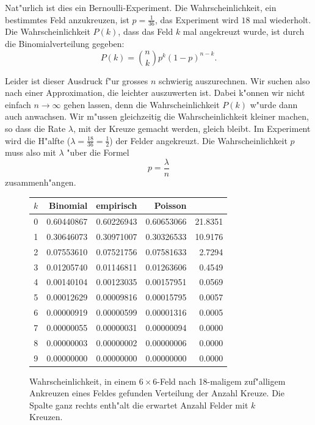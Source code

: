 Nat"urlich ist dies ein Bernoulli-Experiment. Die Wahrscheinlichkeit, ein
bestimmtes Feld anzukreuzen, ist $p=\frac{1}{36}$, das Experiment
wird $18$ mal wiederholt. Die Wahrscheinlichkeit $P(k)$, dass das Feld $k$ mal
angekreuzt wurde, ist durch die Binomialverteilung gegeben:
\[
P(k)=\binom{n}{k}p^k(1-p)^{n-k}.
\]

Leider ist dieser Ausdruck f"ur grosses $n$ schwierig auszurechnen.
Wir suchen also nach einer Approximation, die leichter auszuwerten ist.
Dabei k"onnen wir nicht einfach $n\to\infty$ gehen lassen, denn die
Wahrscheinlichkeit $P(k)$ w"urde dann auch anwachsen. Wir m"ussen
gleichzeitig die Wahrscheinlichkeit kleiner machen, so dass die Rate $\lambda$,
mit der Kreuze gemacht werden, gleich bleibt. Im Experiment wird
die H"alfte ($\lambda=\frac{18}{36}=\frac12$) der Felder angekreuzt.
Die Wahrscheinlichkeit $p$ muss also mit $\lambda$ "uber die Formel
\[
p=\frac{\lambda}{n}
\]
zusammenh"angen.

\begin{figure}
\begin{center}
\begin{tabular}{|r|r|r|r|r|}
\hline
$k$&Binomial&empirisch&Poisson&\\
\hline
0&   0.60440867 & 0.60226943 & 0.60653066 & 21.8351 \\
1&   0.30646073 & 0.30971007 & 0.30326533 & 10.9176 \\
2&   0.07553610 & 0.07521756 & 0.07581633 &  2.7294 \\
3&   0.01205740 & 0.01146811 & 0.01263606 &  0.4549 \\
4&   0.00140104 & 0.00123035 & 0.00157951 &  0.0569 \\
5&   0.00012629 & 0.00009816 & 0.00015795 &  0.0057 \\
6&   0.00000919 & 0.00000599 & 0.00001316 &  0.0005 \\
7&   0.00000055 & 0.00000031 & 0.00000094 &  0.0000 \\
8&   0.00000003 & 0.00000002 & 0.00000006 &  0.0000 \\
9&   0.00000000 & 0.00000000 & 0.00000000 &  0.0000 \\
\hline
\end{tabular}
\end{center}
\caption{Wahrscheinlichkeit, in einem $6\times 6$-Feld nach 18-maligem
zuf"alligem Ankreuzen eines Feldes gefunden Verteilung der Anzahl Kreuze.
Die Spalte ganz rechts enth"alt die erwartet Anzahl Felder mit $k$ Kreuzen.
\label{cross36}}
\end{figure}

